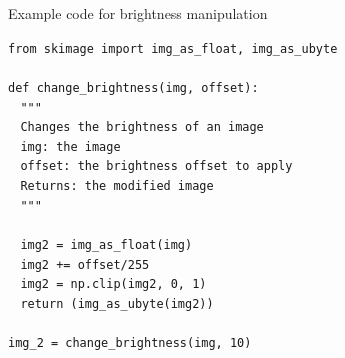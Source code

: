 \documentclass[9pt, aspectratio=169]{beamer}
\begin{document}
\begin{frame}
    {Example code for brightness manipulation}
    \begin{codebox}
        \texttt{from skimage import img\_as\_float, img\_as\_ubyte\\
            \\
            def change\_brightness(img, offset):\\
            $~~~~$"""\\
            $~~~~$Changes the brightness of an image\\
            $~~~~$img: the image\\
            $~~~~$offset: the brightness offset to apply\\
            $~~~~$Returns: the modified image\\
            $~~~~$"""\\
            \\
            $~~~~$img2 = img\_as\_float(img)\\
            $~~~~$img2 += offset/255\\
            $~~~~$img2 = np.clip(img2, 0, 1)\\
            $~~~~$return (img\_as\_ubyte(img2))\\
            \\
            img\_2 = change\_brightness(img, 10)
        }
    \end{codebox}
\end{frame}
\end{document}
